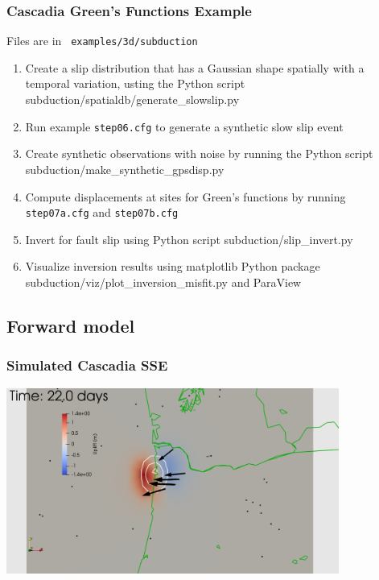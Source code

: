 \documentclass{beamer}
\newcommand{\python}[1]{{\color{red}#1}}
\begin{document}
\begin{frame}
  \frametitle{Cascadia Green's Functions Example}

  \vfill
  Files are in {\tt\color{red} examples/3d/subduction}
  \vfill

  \begin{enumerate}
  \item Create a slip distribution that has a Gaussian shape spatially
    with a temporal variation, usting the Python script
    \python{subduction/spatialdb/generate\_slowslip.py}
  \item Run example {\tt step06.cfg} to generate a synthetic slow slip
    event
  \item Create synthetic observations with noise by running the Python
    script \python{subduction/make\_synthetic\_gpsdisp.py}
  \item Compute displacements at sites for Green's functions by
    running {\tt step07a.cfg} and {\tt step07b.cfg}
  \item Invert for fault slip using Python script
    \python{subduction/slip\_invert.py}
  \item Visualize inversion results using matplotlib Python package
    \python{subduction/viz/plot\_inversion\_misfit.py} and ParaView
  \end{enumerate}
  
\end{frame}


\subsection{Forward model}

\begin{frame}
  \frametitle{Simulated Cascadia SSE}

  \vfill
  \begin{center}
    \includegraphics[height=6.1cm]{figs/subduction3d_step06_soln}
  \end{center}
  \vfill
  
\end{frame}
\end{document}
